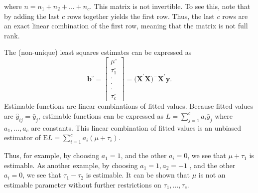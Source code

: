 \noindent where $n=n_{1}+n_{2}+...+n_{c}$. This matrix is not
invertible. To see this, note that by adding the last $c$ rows
together yields the first row. Thus, the last $c$ rows are an exact
linear combination of the first row, meaning that the matrix is not
full rank.

The (non-unique) least squares estimates can be expressed as
\begin{equation*}
\mathbf{b}^{\circ }=%
\begin{bmatrix}
\mu ^{\circ } \\
\tau _{1}^{\circ } \\
\cdot  \\
\cdot  \\
\cdot  \\
\tau _{c}^{\circ }%
\end{bmatrix}%
=\mathbf{(X}^{\prime }\mathbf{X)}^{-}\mathbf{X}^{\prime }\mathbf{y.}
\end{equation*}
Estimable functions are linear combinations of fitted values.
Because fitted values are $\hat{y}_{ij}=\bar{y}_{j}$, estimable
functions can be expressed as $ L=\sum_{j=1}^{c}a_{i}\bar{y}_{j} $
where $a_{1},...,a_{c}$ are constants. This linear combination of
fitted values is an unbiased estimator of $\text{E
}L=\sum_{i=1}^{c}a_{i}(\mu +\tau _{i}). $

Thus, for example, by choosing $a_{1}=1$, and the other $a_{i}=0$,
we see that $\mu
+\tau _{1}$ is estimable. As another example, by choosing $a_{1}=1,a_{2}=-1$%
, and the other $a_{i}=0$, we see that $\tau _{1}-\tau _{2}$ is
estimable. It can be shown that $\mu $ is not an estimable parameter
without further restrictions on $\tau _{1},...,\tau _{c}$.
